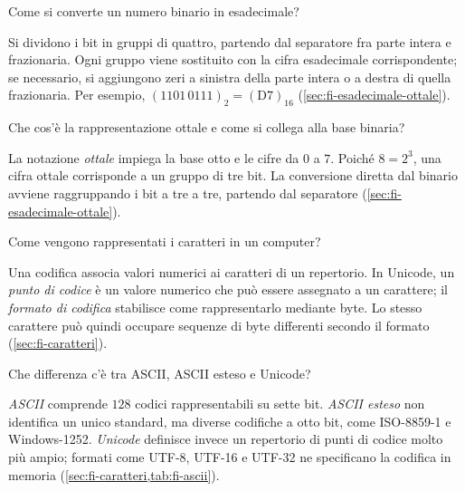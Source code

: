 \begin{exercise}
\label{ex:fi-rappresentazione-conversione-esadecimale}
Come si converte un numero binario in esadecimale?
\end{exercise}

Si dividono i bit in gruppi di quattro, partendo dal separatore
fra parte intera e frazionaria. Ogni gruppo viene sostituito con
la cifra esadecimale corrispondente; se necessario, si aggiungono
zeri a sinistra della parte intera o a destra di quella frazionaria.
Per esempio, \((1101\,0111)_2=(\mathrm{D7})_{16}\)
(\cref{sec:fi-esadecimale-ottale}).

\begin{exercise}
\label{ex:fi-rappresentazione-ottale}
Che cos'è la rappresentazione ottale e come si collega alla base binaria?
\end{exercise}

La notazione \emph{ottale} impiega la base otto e le cifre da
\(0\) a \(7\). Poiché \(8=2^3\), una cifra ottale corrisponde a
un gruppo di tre bit. La conversione diretta dal binario avviene
raggruppando i bit a tre a tre, partendo dal separatore
(\cref{sec:fi-esadecimale-ottale}).

\begin{exercise}
\label{ex:fi-rappresentazione-caratteri}
Come vengono rappresentati i caratteri in un computer?
\end{exercise}

Una codifica associa valori numerici ai caratteri di un repertorio.
In Unicode, un \emph{punto di codice} è un valore numerico che può
essere assegnato a un carattere; il \emph{formato di codifica}
stabilisce come rappresentarlo mediante byte. Lo stesso carattere
può quindi occupare sequenze di byte differenti secondo il formato
(\cref{sec:fi-caratteri}).

\begin{exercise}
\label{ex:fi-rappresentazione-ascii-unicode}
Che differenza c'è tra ASCII, ASCII esteso e Unicode?
\end{exercise}

\emph{ASCII} comprende \(128\) codici rappresentabili su sette bit.
\emph{ASCII esteso} non identifica un unico standard, ma diverse
codifiche a otto bit, come ISO-8859-1 e Windows-1252.
\emph{Unicode} definisce invece un repertorio di punti di codice
molto più ampio; formati come UTF-8, UTF-16 e UTF-32 ne specificano
la codifica in memoria (\cref{sec:fi-caratteri,tab:fi-ascii}).
